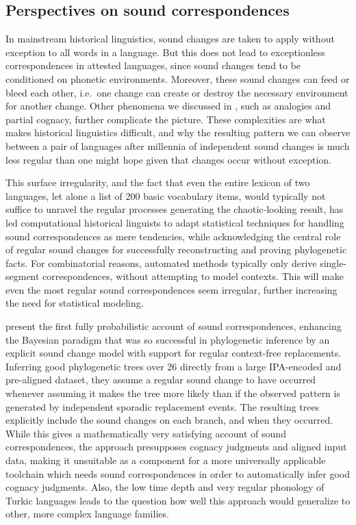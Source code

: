 \subsection{Perspectives on sound correspondences}
In mainstream historical linguistics, sound changes are taken to apply without exception to all words in a language. But this does not lead to exceptionless correspondences in attested languages, since sound changes tend to be conditioned on phonetic environments. Moreover, these sound changes can feed or bleed each other, i.e.\ one change can create or destroy the necessary environment for another change. Other phenomena we discussed in , such as analogies and partial cognacy, further complicate the picture. These complexities are what makes historical linguistics difficult, and why the resulting pattern we can observe between a pair of languages after millennia of independent sound changes is much less regular than one might hope given that changes occur without exception.

This surface irregularity, and the fact that even the entire lexicon of two languages, let alone a list of 200 basic vocabulary items, would typically not suffice to unravel the regular processes generating the chaotic-looking result, has led computational historical linguists to adapt statistical techniques for handling sound correspondences as mere tendencies, while acknowledging the central role of regular sound changes for successfully reconstructing and proving phylogenetic facts. For combinatorial reasons, automated methods typically only derive single-segment correspondences, without attempting to model contexts. This will make even the most regular sound correspondences seem irregular, further increasing the need for statistical modeling.

\cite{hruschka_ea_2015} present the first fully probabilistic account of sound correspondences, enhancing the Bayesian paradigm that was so successful in phylogenetic inference by an explicit sound change model with support for regular context-free replacements. Inferring good phylogenetic trees over 26  directly from a large IPA-encoded and pre-aligned dataset, they assume a regular sound change to have occurred whenever assuming it makes the tree more likely than if the observed pattern is generated by independent sporadic replacement events. The resulting trees explicitly include the sound changes on each branch, and when they occurred. While this gives a mathematically very satisfying account of sound correspondences, the approach presupposes cognacy judgments and aligned input data, making it unsuitable as a component for a more universally applicable toolchain which needs sound correspondences in order to automatically infer good cognacy judgments. Also, the low time depth and very regular phonology of Turkic languages leads to the question how well this approach would generalize to other, more complex language families.


